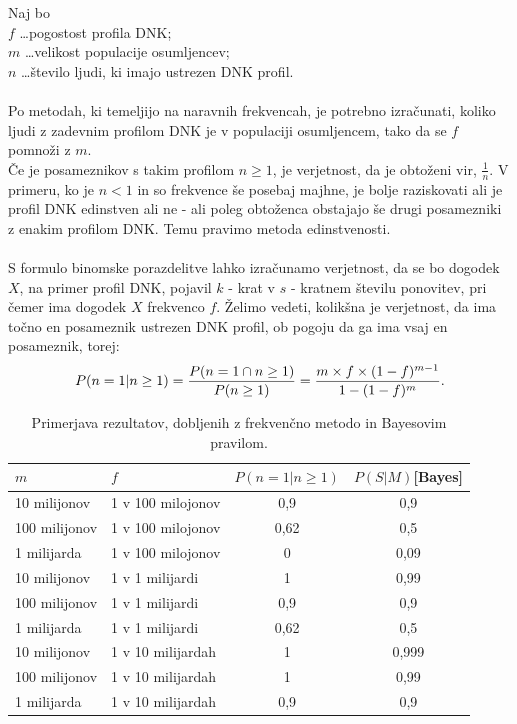 \documentclass[fin1, tisk]{fmfdelo}
\theoremstyle{definition}
\theoremstyle{trditev}
\theoremstyle{izrek}
\begin{document}
Naj bo \\
$f$ \dots pogostost profila DNK;\\
$m$ \dots velikost populacije osumljencev; \\
$n$ \dots število ljudi, ki imajo ustrezen DNK profil. \\\\
Po metodah, ki temeljijo na naravnih frekvencah, je potrebno izračunati, koliko ljudi z zadevnim profilom DNK je v populaciji osumljencem, tako
da se $f$ pomnoži z $m$.  \\
Če je posameznikov s takim profilom $n \ge 1$, je verjetnost, da je obtoženi vir, $\frac{1}{n}$. V primeru, ko je $n < 1$ in so frekvence še
posebaj majhne, je bolje raziskovati ali je profil DNK edinstven ali ne - ali poleg obtoženca obstajajo še drugi posamezniki z enakim
profilom DNK. Temu pravimo metoda edinstvenosti. \\\\
S formulo binomske porazdelitve lahko izračunamo verjetnost, da se bo dogodek $X$, na primer profil DNK, pojavil $k$ - krat v $s$ - kratnem
številu ponovitev, pri čemer ima dogodek $X$ frekvenco $f$. Želimo vedeti, kolikšna je verjetnost, da ima točno en posameznik ustrezen DNK
profil, ob pogoju da ga ima vsaj en posameznik, torej:
\[
   P(n = 1 \lvert n \ge 1) = \frac{P(n=1 \cap n \ge 1)}{P(n \ge 1)} = \frac{m \times f \times (1 - f)^{m-1}}{1 - (1 - f)^m}. \vspace{2mm}
\]
\begin{table}[h!]
    \centering
    \caption{Primerjava rezultatov, dobljenih z frekvenčno metodo in Bayesovim pravilom. \vspace{2mm}}
    \begin{tabular}{l l c c}
        \hline
        $m$ & $f$ & $P(n = 1 \lvert n \ge 1)$ & $P(S \lvert M)$[Bayes]\\
        \hline
        10 milijonov & 1 v 100 milojonov & 0,9 & 0,9 \\
        100 milijonov & 1 v 100 milojonov & 0,62 & 0,5 \\
        1 milijarda & 1 v 100 milojonov & 0 & 0,09 \\ \hline
        10 milijonov & 1 v 1 milijardi & 1 & 0,99 \\
        100 milijonov & 1 v 1 milijardi & 0,9 & 0,9 \\
        1 milijarda & 1 v 1 milijardi & 0,62 & 0,5 \\ \hline
        10 milijonov & 1 v 10 milijardah & 1 & 0,999 \\
        100 milijonov & 1 v 10 milijardah & 1 & 0,99 \\
        1 milijarda & 1 v 10 milijardah & 0,9 & 0,9 \\ \hline
    \end{tabular}
 \end{table}
 
\end{document}
